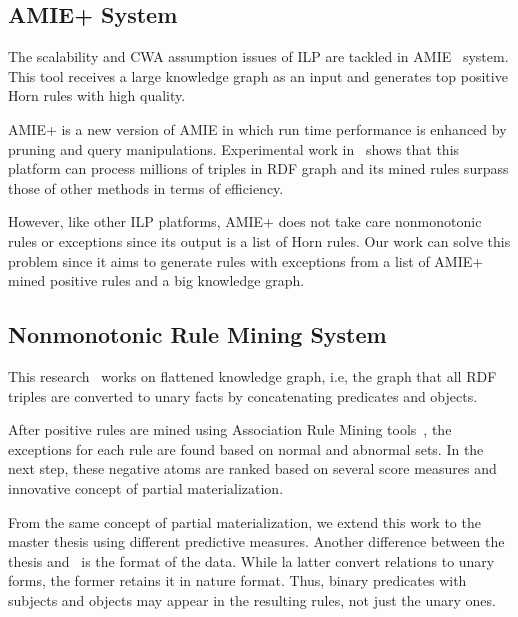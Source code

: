 \subsection{AMIE+ System}

The scalability and CWA assumption issues of ILP are tackled in AMIE~\cite{ref10} system. This tool receives a large knowledge graph as an input and generates top positive Horn rules with high quality.

AMIE+ is a new version of AMIE in which run time performance is enhanced by pruning and query manipulations. Experimental work in~\cite{ref10} shows that this platform can process millions of triples in RDF graph and its mined rules surpass those of other methods in terms of efficiency.

However, like other ILP platforms, AMIE+ does not take care nonmonotonic rules or exceptions since its output is a list of Horn rules. Our work can solve this problem since it aims to generate rules with exceptions from a list of AMIE+ mined positive rules and a big knowledge graph.

\subsection{Nonmonotonic Rule Mining System}

This research~\cite{ref12} works on flattened knowledge graph, i.e, the graph that all RDF triples are converted to unary facts by concatenating predicates and objects.

After positive rules are mined using Association Rule Mining tools~\cite{ref13}, the exceptions for each rule are found based on normal and abnormal sets. In the next step, these negative atoms are ranked based on several score measures and innovative concept of partial materialization.

From the same concept of partial materialization, we extend this work to the master thesis using different predictive measures. Another difference between the thesis and~\cite{ref12} is the format of the data. While la latter convert relations to unary forms, the former retains it in nature format. Thus, binary predicates with subjects and objects may appear in the resulting rules, not just the unary ones.
